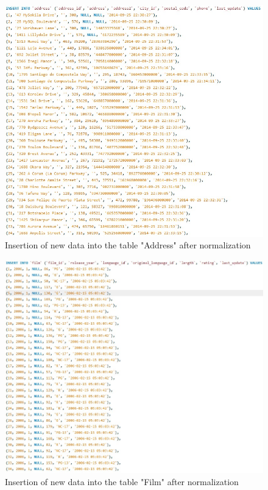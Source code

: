 \documentclass[openany]{article}
\begin{document}
		\begin{figure}[H]
			\includegraphics[width=\textwidth, height=\textheight, keepaspectratio]{address_insert_norm}
			\caption{Insertion of new data into the table "Address" after normalization}
		\end{figure}
		\begin{figure}[H]
			\includegraphics[width=\textwidth, height=\textheight, keepaspectratio]{film_insert_norm}
			\caption{Insertion of new data into the table "Film" after normalization}
		\end{figure}
\end{document}
